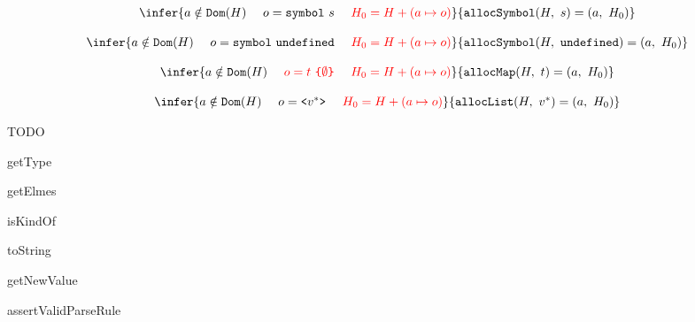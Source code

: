 \documentclass[11pt]{article}
\newcommand{\Term}[1]{\texttt{#1}}
\newcommand{\inred}[1]{{\color{red}{#1}}}
\newcommand{\symheap}[0]{H}
\newcommand{\symlist}[1]{\Term{<} #1 \Term{>}}
\newcommand{\hallocsym}[4]{\Term{allocSymbol}(#1,\ #2) = (#3,\ #4)}
\newcommand{\halloclist}[4]{\Term{allocList}(#1,\ #2) = (#3,\ #4)}
\newcommand{\hallocmap}[4]{\Term{allocMap}(#1,\ #2) = (#3,\ #4)}
\begin{document}
\[\begin{array}{c}
\infer
{a \notin \Term{Dom}(\symheap)\ \ \ \
o = \Term{symbol}\ s\ \ \ \
\inred{\symheap_0 = \symheap + (a \mapsto o)}}
{\hallocsym{\symheap}{s}{a}{\symheap_0}}
\\ \\
\infer
{a \notin \Term{Dom}(\symheap)\ \ \ \
o = \Term{symbol}\ \Term{undefined}\ \ \ \
\inred{\symheap_0 = \symheap + (a \mapsto o)}}
{\hallocsym{\symheap}{\Term{undefined}}{a}{\symheap_0}}
\\ \\
\infer
{a \notin \Term{Dom}(\symheap)\ \ \ \
\inred{o = t\ \Term{\{} {\emptyset} \Term{\}}}\ \ \ \
\inred{\symheap_0 = \symheap + (a \mapsto o)}}
{\hallocmap{\symheap}{t}{a}{\symheap_0}}
\\ \\
\infer
{a \notin \Term{Dom}(\symheap)\ \ \ \
o = \symlist{v^*}\ \ \ \
\inred{\symheap_0 = \symheap + (a \mapsto o)}}
{\halloclist{\symheap}{v^*}{a}{\symheap_0}}
\end{array}\]

TODO

getType

getElmes

isKindOf

toString

getNewValue

assertValidParseRule
\end{document}
